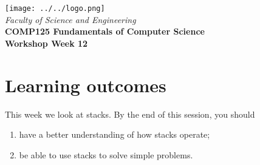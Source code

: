 \usepackage[T1]{fontenc}
\usepackage{pslatex}
 \usepackage[pdftex]{color}  
 \usepackage[pdftex]{graphicx}     
\usepackage{verbatim}
\usepackage{xcolor}
\usepackage{paralist}
\usepackage{tagging}

\usepackage[colorlinks=true,urlcolor=red]{hyperref}
\setlength{\topmargin}{-0.5in}                  %
\setlength{\textheight}{9.5in}                  %
\setlength{\oddsidemargin}{0in}                 %
\setlength{\evensidemargin}{0in}                %
\setlength{\textwidth}{6.5in}                   %
\setlength{\parindent}{0.0in}
\newcommand{\code}{\texttt}

\usepackage{listings}




%
\vspace{0.2in}
\begin{center}
        {\large  %
\texttt{[image: ../../logo.png]}\\
\medskip
        {\it  Faculty of Science and Engineering\\}
        \vspace{0.2in}
         {\bf COMP125 Fundamentals of Computer Science\\
        Workshop Week 12\\}}
\end{center}
\vspace{0.3in}
%

\renewcommand{\labelenumi}{\alph{enumi}.}
 
\section*{Learning outcomes}
This week we look at stacks. By the end of this session, you should 
\begin{enumerate}
\item have a better understanding of how stacks operate;
\item be able to use stacks to solve simple problems.
\end{enumerate}
\vskip 0.5cm

